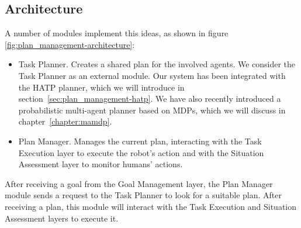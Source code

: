 
\subsection{Architecture}
A number of modules implement this ideas, as shown in figure \ref{fig:plan_management-architecture}:
\begin{itemize}
\item Task Planner. Creates a shared plan for the involved agents. We consider the Task Planner as an external module. Our system has been integrated with the HATP planner, which we will introduce in section~\ref{sec:plan_management-hatp}. We have also recently introduced a probabilistic multi-agent planner based on MDPs, which we will discuss in chapter~\ref{chapter:mamdp}.
\item Plan Manager. Manages the current plan, interacting with the Task Execution layer to execute the robot's action and with the Situation Assessment layer to monitor humans' actions.
\end{itemize}

After receiving a goal from the Goal Management layer, the Plan Manager module sends a request to the Task Planner to look for a suitable plan. After receiving a plan, this module will interact with the Task Execution and Situation Assessment layers to execute it. 

